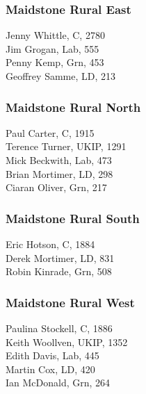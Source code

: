 \documentclass[a4paper,openany,10pt]{book}
\begin{document}
\subsubsection*{Maidstone Rural East}



Jenny Whittle, C, 2780\\
Jim Grogan, Lab, 555\\
Penny Kemp, Grn, 453\\
Geoffrey Samme, LD, 213\\


\subsubsection*{Maidstone Rural North}



Paul Carter, C, 1915\\
Terence Turner, UKIP, 1291\\
Mick Beckwith, Lab, 473\\
Brian Mortimer, LD, 298\\
Ciaran Oliver, Grn, 217\\


\subsubsection*{Maidstone Rural South}



Eric Hotson, C, 1884\\
Derek Mortimer, LD, 831\\
Robin Kinrade, Grn, 508\\


\subsubsection*{Maidstone Rural West}



Paulina Stockell, C, 1886\\
Keith Woollven, UKIP, 1352\\
Edith Davis, Lab, 445\\
Martin Cox, LD, 420\\
Ian McDonald, Grn, 264\\
\end{document}
